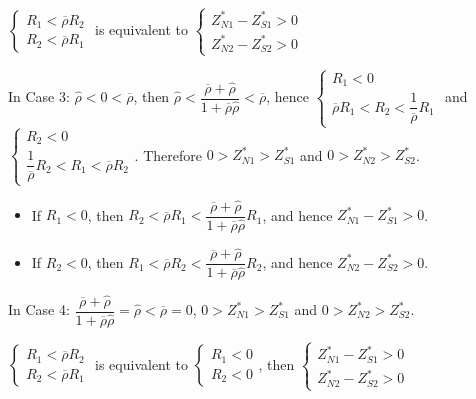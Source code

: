 \documentclass[10pt]{article}
\begin{document}
$ \left\{ \begin{matrix} R_1 < \overline{\rho} R_2 \\ R_2 < \overline{\rho} R_1 \end{matrix} \right. $ is equivalent to $ \left\{ \begin{matrix} Z_{N 1}^* - Z_{S 1}^* > 0 \\ Z_{N 2}^* - Z_{S 2}^* > 0 \end{matrix} \right. $

In Case 3: $ {\hat \rho} < 0 < \overline{\rho} $, then $ {\hat \rho} < \dfrac{\overline{\rho} + {\hat \rho}}{1 + \overline{\rho} {\hat \rho}} < \overline{\rho} $, hence $ \left\{ \begin{matrix} R_1 < 0 \\ \overline{\rho} R_1 < R_2 < \dfrac{1}{\overline{\rho}} R_1 \end{matrix} \right. $ and $ \left\{ \begin{matrix} R_2 < 0 \\ \dfrac{1}{\overline{\rho}} R_2 < R_1 < \overline{\rho} R_2 \end{matrix} \right. $.
Therefore $ 0 > Z_{N 1}^* > Z_{S 1}^* $ and $ 0 > Z_{N 2}^* > Z_{S 2}^* $.
\begin{itemize}
\item If $ R_1 < 0 $, then $ R_2 < \overline{\rho} R_1 < \dfrac{\overline{\rho} + {\hat \rho}}{1 + \overline{\rho} {\hat \rho}} R_1 $, and hence $ Z_{N 1}^* - Z_{S 1}^* > 0 $.
\item If $ R_2 < 0 $, then $ R_1 < \overline{\rho} R_2 < \dfrac{\overline{\rho} + {\hat \rho}}{1 + \overline{\rho} {\hat \rho}} R_2 $, and hence $ Z_{N 2}^* - Z_{S 2}^* > 0 $.
\end{itemize}

In Case 4: $ \dfrac{\overline{\rho} + {\hat \rho}}{1 + \overline{\rho} {\hat \rho}} = {\hat \rho} < \overline{\rho} = 0 $, $ 0 > Z_{N 1}^* > Z_{S 1}^* $ and $ 0 > Z_{N 2}^* > Z_{S 2}^* $.

$ \left\{ \begin{matrix} R_1 < \overline{\rho} R_2 \\ R_2 < \overline{\rho} R_1 \end{matrix} \right. $ is equivalent to $ \left\{ \begin{matrix} R_1 < 0 \\ R_2 < 0 \end{matrix} \right. $, then $ \left\{ \begin{matrix} Z_{N 1}^* - Z_{S 1}^* > 0 \\ Z_{N 2}^* - Z_{S 2}^* > 0 \end{matrix} \right. $
\end{document}

